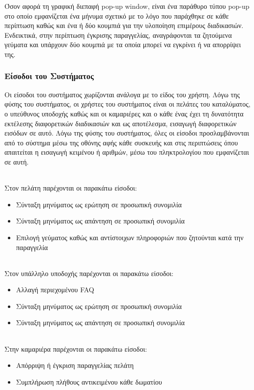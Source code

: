 \noindent
Όσον αφορά τη γραφική διεπαφή pop-up window, είναι ένα παράθυρο τύπου pop-up στο οποίο εμφανίζεται
ένα μήνυμα σχετικό με το λόγο που παράχθηκε σε κάθε περίπτωση καθώς και ένα ή δύο κουμπιά για την 
υλοποίηση επιμέρους διαδικασιών. Ενδεικτικά, στην περίπτωση έγκρισης παραγγελίας, αναγράφονται τα 
ζητούμενα γεύματα και υπάρχουν δύο κουμπιά με τα οποία μπορεί να εγκρίνει ή να απορρίψει της. 


\subsubsection{Είσοδοι του Συστήματος}
Οι είσοδοι του συστήματος χωρίζονται ανάλογα με το είδος του χρήστη. Λόγω της φύσης του 
συστήματος, οι χρήστες του συστήματος είναι οι πελάτες του καταλύματος, ο υπεύθυνος υποδοχής 
καθώς και οι καμαριέρες και ο κάθε ένας έχει τη δυνατότητα εκτέλεσης διαφορετικών διαδικασιών και ως
αποτέλεσμα, εισαγωγή διαφορετικών εισόδων σε αυτό.  Λόγω της φύσης του συστήματος, όλες οι 
είσοδοι προσλαμβάνονται από το σύστημα μέσω της οθόνης αφής κάθε συσκευής και στις περιπτώσεις
όπου απαιτείται η εισαγωγή κειμένου ή αριθμών, μέσω του πληκτρολογίου που εμφανίζεται σε αυτή.

\noindent \\ 
Στον πελάτη παρέχονται οι παρακάτω είσοδοι:
\begin{itemize}
	\item Σύνταξη μηνύματος ως ερώτηση σε προσωπική συνομιλία
	\item Σύνταξη μηνύματος ως απάντηση σε προσωπική συνομιλία
	\item Επιλογή γεύματος καθώς και αντίστοιχων πληροφοριών που ζητούνται κατά την παραγγελία
\end{itemize}

\noindent \\ 
Στον υπάλληλο υποδοχής παρέχονται οι παρακάτω είσοδοι:
\begin{itemize}
	\item Αλλαγή περιεχομένου FAQ
	\item Σύνταξη μηνύματος ως ερώτηση σε προσωπική συνομιλία
	\item Σύνταξη μηνύματος ως απάντηση σε προσωπική συνομιλία 
\end{itemize}

\noindent \\ 
Στην καμαριέρα παρέχονται οι παρακάτω είσοδοι:
\begin{itemize}
	\item Απόρριψη ή έγκριση παραγγελίας πελάτη
	\item Συμπλήρωση πλήθους αντικειμένου κάθε δωματίου
\end{itemize}



